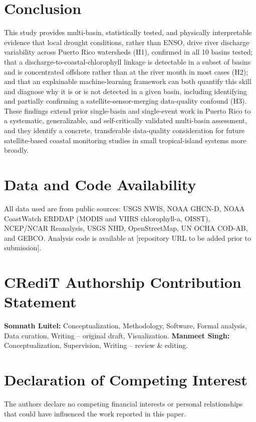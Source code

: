 \documentclass[preprint,12pt]{elsarticle}
\begin{document}
\section{Conclusion}
This study provides multi-basin, statistically tested, and physically interpretable evidence that local drought conditions, rather than ENSO, drive river discharge variability across Puerto Rico watersheds (H1), confirmed in all 10 basins tested; that a discharge-to-coastal-chlorophyll linkage is detectable in a subset of basins and is concentrated offshore rather than at the river mouth in most cases (H2); and that an explainable machine-learning framework can both quantify this skill and diagnose why it is or is not detected in a given basin, including identifying and partially confirming a satellite-sensor-merging data-quality confound (H3). These findings extend prior single-basin and single-event work in Puerto Rico to a systematic, generalizable, and self-critically validated multi-basin assessment, and they identify a concrete, transferable data-quality consideration for future satellite-based coastal monitoring studies in small tropical-island systems more broadly.

\section*{Data and Code Availability}
All data used are from public sources: USGS NWIS, NOAA GHCN-D, NOAA CoastWatch ERDDAP (MODIS and VIIRS chlorophyll-a, OISST), NCEP/NCAR Reanalysis, USGS NHD, OpenStreetMap, UN OCHA COD-AB, and GEBCO. Analysis code is available at [repository URL to be added prior to submission].

\section*{CRediT Authorship Contribution Statement}
\textbf{Somnath Luitel:} Conceptualization, Methodology, Software, Formal analysis, Data curation, Writing -- original draft, Visualization. \textbf{Manmeet Singh:} Conceptualization, Supervision, Writing -- review \& editing.

\section*{Declaration of Competing Interest}
The authors declare no competing financial interests or personal relationships that could have influenced the work reported in this paper.



\end{document}
